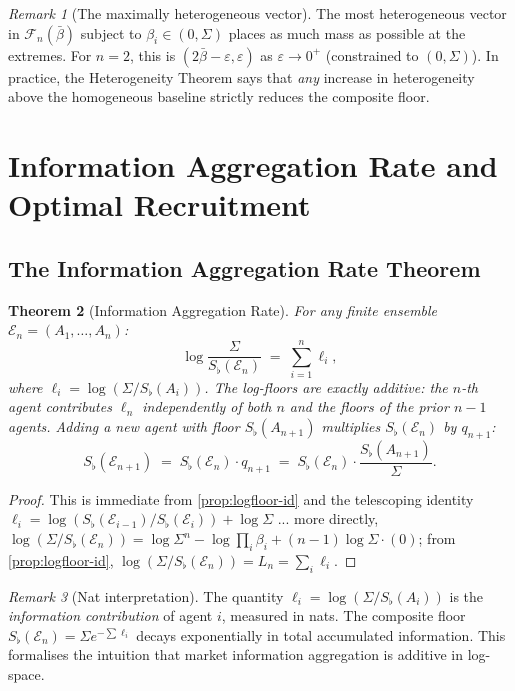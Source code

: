 \documentclass[twocolumn,11pt,a4paper]{article}
\newtheorem{theorem}{Theorem}[section]
\theoremstyle{remark}
\newtheorem{remark}[theorem]{Remark}
\newcommand{\Sflat}{S_{\flat}}
\newcommand{\Ens}{\mathcal{E}}
\newcommand{\logfl}{\ell}                 %
\newcommand{\Logfl}{L}                    %
\begin{document}
\begin{remark}[The maximally heterogeneous vector]
The most heterogeneous vector in $\mathcal{F}_n(\bar\beta)$ subject to
$\beta_i \in (0,\Sigma)$ places as much mass as possible at the extremes.
For $n=2$, this is $(2\bar\beta - \varepsilon, \varepsilon)$ as
$\varepsilon\to 0^+$ (constrained to $(0,\Sigma)$).  In practice, the
Heterogeneity Theorem says that \emph{any} increase in heterogeneity above
the homogeneous baseline strictly reduces the composite floor.
\end{remark}

\section{Information Aggregation Rate and Optimal Recruitment}
\label{sec:rate}

\subsection{The Information Aggregation Rate Theorem}
\label{sec:rate:thm}

\begin{theorem}[Information Aggregation Rate]
\label{thm:rate}
For any finite ensemble $\Ens_n = (A_1,\ldots,A_n)$:
\[
  \log\!\frac{\Sigma}{\Sflat(\Ens_n)} \;=\; \sum_{i=1}^n \logfl_i,
\]
where $\logfl_i = \log(\Sigma/\Sflat(A_i))$.  The log-floors are exactly
additive: the $n$-th agent contributes $\logfl_n$ independently of both $n$
and the floors of the prior $n-1$ agents.  Adding a new agent with floor
$\Sflat(A_{n+1})$ multiplies $\Sflat(\Ens_n)$ by $q_{n+1}$:
\[
  \Sflat(\Ens_{n+1}) \;=\; \Sflat(\Ens_n) \cdot q_{n+1}
  \;=\; \Sflat(\Ens_n) \cdot \frac{\Sflat(A_{n+1})}{\Sigma}.
\]
\end{theorem}
\begin{proof}
This is immediate from \cref{prop:logfloor-id} and the telescoping identity
$\logfl_i = \log(\Sflat(\Ens_{i-1})/\Sflat(\Ens_i)) + \log\Sigma$ ... more
directly, $\log(\Sigma/\Sflat(\Ens_n)) = \log \Sigma^n - \log\prod_i \beta_i
+ (n-1)\log\Sigma \cdot (0)$; from \cref{prop:logfloor-id},
$\log(\Sigma/\Sflat(\Ens_n)) = \Logfl_n = \sum_i \logfl_i$.
\end{proof}

\begin{remark}[Nat interpretation]
The quantity $\logfl_i = \log(\Sigma/\Sflat(A_i))$ is the \emph{information
contribution} of agent $i$, measured in nats.  The composite floor
$\Sflat(\Ens_n) = \Sigma e^{-\sum \logfl_i}$ decays exponentially in total
accumulated information.  This formalises the intuition that market
information aggregation is additive in log-space.
\end{remark}
\end{document}
